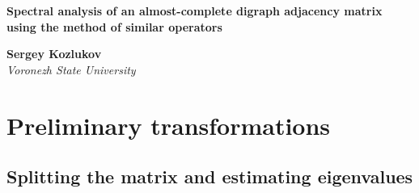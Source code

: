 \documentclass[12pt,a4paper,twoside]{article}
\theoremstyle{definition}
\begin{document}

\begin{center}
    \textbf{Spectral analysis of an almost-complete digraph adjacency matrix
    using the method of similar operators}
    
    \textbf{Sergey Kozlukov}\\[2mm]
    \emph{Voronezh State University}
\end{center}


\begin{abstract}
    
\end{abstract}


\section*{Preliminary transformations}

\subsection*{Splitting the matrix and estimating eigenvalues}


\newpage

\printbibliography
\end{document}
